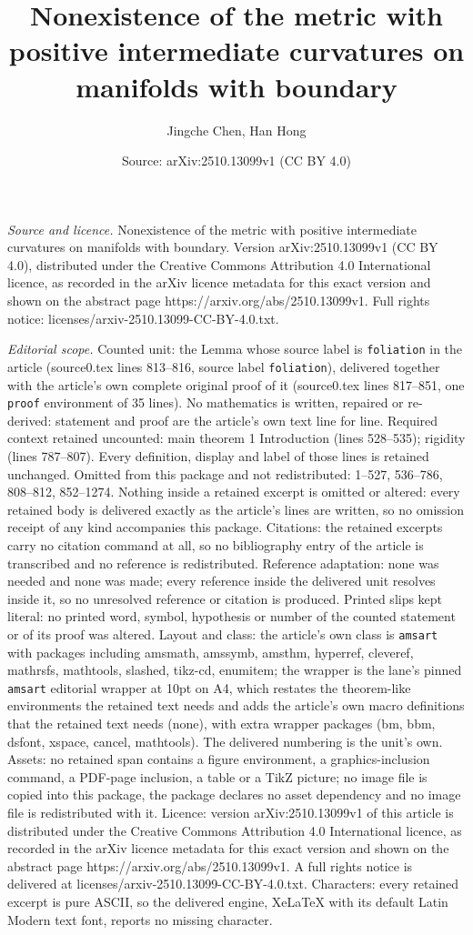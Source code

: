\documentclass[10pt,a4paper]{amsart}
\title[Nonexistence of the metric with positive intermediate curvat]{Nonexistence of the metric with positive intermediate curvatures on manifolds with boundary}
\author{Jingche Chen, Han Hong}
\date{Source: arXiv:2510.13099v1 (CC BY 4.0)}
\begin{document}
\maketitle

\noindent\emph{Source and licence.} Nonexistence of the metric with positive intermediate curvatures on manifolds with boundary. Version arXiv:2510.13099v1 (CC BY 4.0), distributed under the Creative Commons Attribution 4.0 International licence, as recorded in the arXiv licence metadata for this exact version and shown on the abstract page https://arxiv.org/abs/2510.13099v1. Full rights notice: licenses/arxiv-2510.13099-CC-BY-4.0.txt.\par\smallskip

\noindent\textit{Editorial scope.} Counted unit: the Lemma whose source label is \texttt{foliation} in the article (source0.tex lines 813--816, source label \texttt{foliation}), delivered together with the article's own complete original proof of it (source0.tex lines 817--851, one \texttt{proof} environment of 35 lines). No mathematics is written, repaired or re-derived: statement and proof are the article's own text line for line. Required context retained uncounted: main theorem 1 Introduction (lines 528--535); rigidity (lines 787--807). Every definition, display and label of those lines is retained unchanged. Omitted from this package and not redistributed: 1--527, 536--786, 808--812, 852--1274. Nothing inside a retained excerpt is omitted or altered: every retained body is delivered exactly as the article's lines are written, so no omission receipt of any kind accompanies this package. Citations: the retained excerpts carry no citation command at all, so no bibliography entry of the article is transcribed and no reference is redistributed. Reference adaptation: none was needed and none was made; every reference inside the delivered unit resolves inside it, so no unresolved reference or citation is produced. Printed slips kept literal: no printed word, symbol, hypothesis or number of the counted statement or of its proof was altered. Layout and class: the article's own class is \texttt{amsart} with packages including amsmath, amssymb, amsthm, hyperref, cleveref, mathrsfs, mathtools, slashed, tikz-cd, enumitem; the wrapper is the lane's pinned \texttt{amsart} editorial wrapper at 10pt on A4, which restates the theorem-like environments the retained text needs and adds the article's own macro definitions that the retained text needs (none), with extra wrapper packages (bm, bbm, dsfont, xspace, cancel, mathtools). The delivered numbering is the unit's own. Assets: no retained span contains a figure environment, a graphics-inclusion command, a PDF-page inclusion, a table or a TikZ picture; no image file is copied into this package, the package declares no asset dependency and no image file is redistributed with it. Licence: version arXiv:2510.13099v1 of this article is distributed under the Creative Commons Attribution 4.0 International licence, as recorded in the arXiv licence metadata for this exact version and shown on the abstract page https://arxiv.org/abs/2510.13099v1. A full rights notice is delivered at licenses/arxiv-2510.13099-CC-BY-4.0.txt. Characters: every retained excerpt is pure ASCII, so the delivered engine, XeLaTeX with its default Latin Modern text font, reports no missing character.
\end{document}
